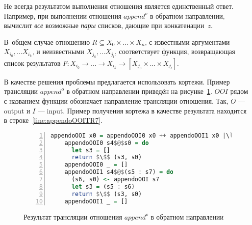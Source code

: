 Не всегда результатом выполнения отношения является единственный ответ.
Например, при выполнении отношения $append^o$ в обратном направлении, \miniKanren{} вычислит \emph{все} возможные \emph{пары} списков, дающие при конкатенации~$z$.

В~общем случае отношению $R \subseteq X_0 \times \dots \times X_n$, с известными аргументами $X_{i_0}, \dots X_{i_k}$, и неизвестными $X_{j_0}, \dots X_{j_l}$, соответствует функция, возвращающая список результатов $F : X_{i_0} \to \dots \to X_{i_k} \to [X_{j_0} \times \dots \times X_{j_l}]$. 

В качестве решения проблемы предлагается использовать кортежи.
Пример трансляции $append^o$ в обратном направлении приведён на рисунке~\ref{lst:appendoOOITR}.
$OOI$ рядом с названием функции обозначает направление трансляции отношения.
Так, $O$ --- output и $I$ --- input.
Пример получения кортежа в качестве результата находится в строке~\ref{line:appendoOOITR7}.

\begin{figure}[h!]
  \begin{center}
  \begin{minipage}{0.7\textwidth}
  \begin{lstlisting}[language=Haskell, frame=single, numbers=left,numberstyle=\small, firstnumber=1, escapechar=|]
    appendoOOI x0 = appendoOOI0 x0 ++ appendoOOI1 x0 |\label{line:appendoOOITR1}|
    appendoOOI0 s4$@$s0 = do                         |\label{line:appendoOOITR2}|
      let s3 = []                                    |\label{line:appendoOOITR3}|
      return $\$$ (s3, s0)                           |\label{line:appendoOOITR4}|
    appendoOOI0 _ = []                               |\label{line:appendoOOITR5}|
    appendoOOI1 s4$@$(s5 : s7) = do                  |\label{line:appendoOOITR6}|
      (s6, s0) <- appendoOOI s7                      |\label{line:appendoOOITR7}|
      let s3 = (s5 : s6)                             |\label{line:appendoOOITR8}|
      return $\$$ (s3, s0)                           |\label{line:appendoOOITR9}|
    appendoOOI1 _ = []                               |\label{line:appendoOOITR10}|
    \end{lstlisting}
  \end{minipage}
  \end{center}
  \caption{Результат трансляции отношения $append^o$ в обратном направлении}
  \label{lst:appendoOOITR}
\end{figure}


